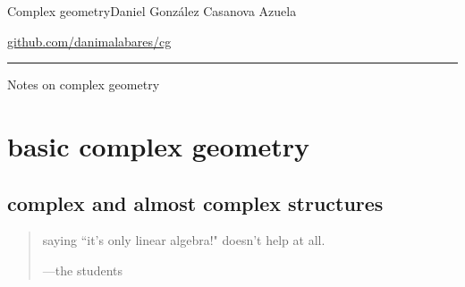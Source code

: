 
%

\newcommand{\rightlooparrow}{\mathbin{
    \vbox{\openup-10.25pt\halign{\hss$##$\hss\cr\circ\cr\longrightarrow\cr}}
}}




\begin{minipage}{\textwidth}
	\begin{minipage}{1\textwidth}
		Complex geometry\hfill Daniel González Casanova Azuela
		
		{\small \hfill\href{https://github.com/danimalabares/cg}{github.com/danimalabares/cg}}
	\end{minipage}
\end{minipage}\vspace{.2cm}\hrule

\vspace{10pt}
{\huge Notes on complex geometry}
\tableofcontents

\section{basic complex geometry}

\subsection{complex and almost complex structures}
\vspace{1em}
\begin{quotation}
saying ``it's only linear algebra!" doesn't help at all.

	\hfill ---the students
\end{quotation}
\vspace{2em}


